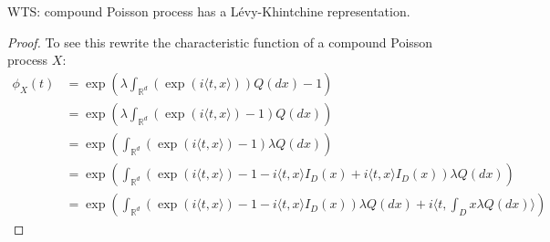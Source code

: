 \documentclass[a4paper,11pt]{article}
\begin{document}
\section{}
WTS: compound Poisson process has a Lévy-Khintchine representation.
\begin{proof}
    To see this rewrite the characteristic function of a compound Poisson process $X$:
    \begin{align}
        \phi_{X}(t) & = \exp \left(  \lambda\int_{\mathbb{R}^{d}} ( \exp ( i \langle t, x \rangle)) Q ( d x )-1  \right)                                                                       \\
                    & = \exp \left(  \lambda\int_{\mathbb{R}^{d}} ( \exp ( i \langle t, x \rangle)-1) Q ( d x )  \right)                                                                       \\
                    & = \exp \left(  \int_{\mathbb{R}^{d}} ( \exp ( i \langle t, x \rangle)-1) \lambda Q ( d x )  \right)                                                                      \\
                    & = \exp \left(  \int_{\mathbb{R}^{d}} ( \exp ( i \langle t, x \rangle)-1- i \langle t, x \rangle I_{D}(x) + i \langle t, x \rangle I_{D}(x) )  \lambda Q ( d x )  \right) \\
                    & = \exp \left(  \int_{\mathbb{R}^{d}} ( \exp ( i \langle t, x \rangle)-1- i \langle t, x \rangle  I_{D}(x)) \lambda Q ( d x )
        +  i \langle t, \int_{D}x\lambda Q ( d x ) \rangle      \right)
    \end{align}
\end{proof}
\end{document}
